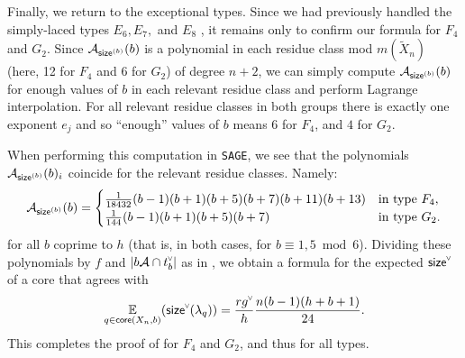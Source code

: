 \documentclass[ALCO,published]{cedram}
\newcommand{\chk}[1]{#1^{\normalfont\smash{\scalebox{.5}[.5]{\rotatebox{90}{\textbf{\textless}}}}}}
\newcommand{\Expt}[2]{\operatorname*{\mathbb{E}}\limits_{#1}(#2)}
\newcommand{\ac}{\mathcal{A}}
\newcommand{\core}{{\sf core}}
\newcommand{\size}{{\sf size}}
\newcommand{\sizeb}{\size^{(b)}}
\newcommand{\bt}{t_b}
\begin{document}
Finally, we return to the exceptional types. Since we had previously handled the simply-laced types $E_6, E_7,$ and $E_8$ \cite[Section 7.6]{thiel2017strange}, it remains only to confirm our formula for $F_4$ and $G_2$. Since $\ac_{\sizeb}(b)$ is a polynomial in each residue class mod $m(\widetilde{X}_n)$ (here, 12 for $F_4$ and 6 for $G_2$) of degree $n+2$, we can simply compute $\ac_{\sizeb}(b)$ for enough values of $b$ in each relevant residue class and perform Lagrange interpolation. For all relevant residue classes in both groups there is exactly one exponent $e_j$ and so ``enough'' values of $b$ means $6$ for $F_4$, and $4$ for $G_2$.

When performing this computation in \texttt{SAGE}, we see that the polynomials $\ac_{\sizeb}(b)_i$ coincide for the relevant residue classes. Namely:
\[
\ac_{\sizeb}(b)=
\begin{cases}
\frac{1}{18432}(b-1)(b+1)(b+5)(b+7)(b+11)(b+13) & \text{in type } F_4, \\
\frac{1}{144}(b-1)(b+1)(b+5)(b+7) & \text{in type } G_2.
\end{cases}
\]
for all $b$ coprime to $h$ (that is, in both cases, for $b\equiv 1,5\bmod 6$). Dividing these polynomials by $f$ and $|b\ac\cap\chk{\bt}|$ as in , we obtain a formula for the expected $\chk{\size}$ of a core that agrees with
\[
\Expt{q \in \core(X_n,b)}{\chk{\size}(\lambda_q)}=\frac{r \chk{g}}{h}\frac{n(b-1)(h+b+1)}{24}.
\]
This completes the proof of  for $F_4$ and $G_2$, and thus for all types.








\end{document}
